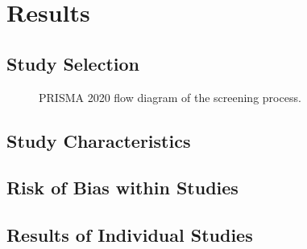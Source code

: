 
\section{Results}\label{sec:results}


\subsection{Study Selection}\label{sec:study-selection}


\begin{figure}[htbp]
\centering

\caption{PRISMA 2020 flow diagram of the screening process.}
\label{fig:prisma-flow}
\end{figure}

\subsection{Study Characteristics}\label{sec:study-characteristics}


\subsection{Risk of Bias within Studies}\label{sec:rob-results}


\subsection{Results of Individual Studies}\label{sec:individual-results}

